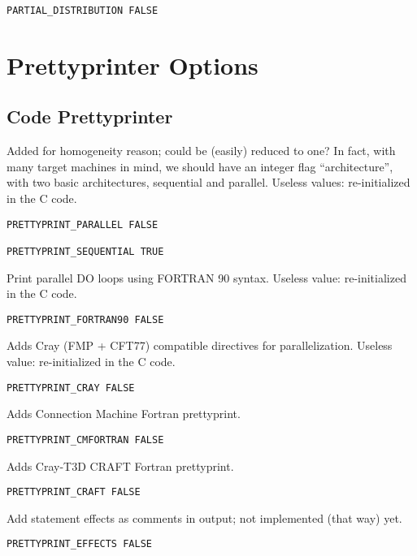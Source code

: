 \begin{verbatim}
PARTIAL_DISTRIBUTION FALSE
\end{verbatim}

\section{Prettyprinter Options}
\label{section-prettyprinters}

\subsection{Code Prettyprinter}

Added for homogeneity reason; could be (easily) reduced to one?  In
fact, with many target machines in mind, we should have an integer flag
``architecture'', with two basic architectures, sequential and parallel.
Useless values: re-initialized in the C code.

\begin{verbatim}
PRETTYPRINT_PARALLEL FALSE

PRETTYPRINT_SEQUENTIAL TRUE
\end{verbatim}

Print parallel DO loops using FORTRAN 90 syntax. Useless value:
re-initialized in the C code.

\begin{verbatim}
PRETTYPRINT_FORTRAN90 FALSE
\end{verbatim}

Adds Cray (FMP + CFT77) compatible directives for parallelization.
Useless value: re-initialized in the C code.

\begin{verbatim}
PRETTYPRINT_CRAY FALSE
\end{verbatim}

Adds Connection Machine Fortran prettyprint.

\begin{verbatim}
PRETTYPRINT_CMFORTRAN FALSE
\end{verbatim}

Adds Cray-T3D CRAFT Fortran prettyprint.

\begin{verbatim}
PRETTYPRINT_CRAFT FALSE
\end{verbatim}

Add statement effects as comments in output; not implemented (that way) yet.

\begin{verbatim}
PRETTYPRINT_EFFECTS FALSE
\end{verbatim}


